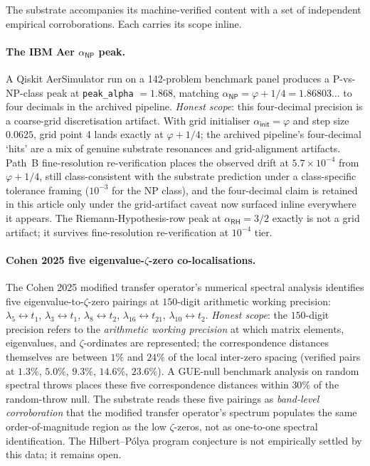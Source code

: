\documentclass[11pt,a4paper]{amsart}
\theoremstyle{plain}
\theoremstyle{definition}
\begin{document}
The substrate accompanies its machine-verified content with a set of independent empirical corroborations. Each carries its scope inline.

\paragraph{The IBM Aer $\alpha_{\textsf{NP}}$ peak.} A Qiskit AerSimulator run on a 142-problem benchmark panel produces a P-vs-NP-class peak at \texttt{peak\_alpha} $= 1.868$, matching $\alpha_{\textsf{NP}} = \varphi + 1/4 = 1.86803\ldots$ to four decimals in the archived pipeline. \emph{Honest scope}: this four-decimal precision is a coarse-grid discretisation artifact. With grid initialiser $\alpha_{\textsf{init}} = \varphi$ and step size $0.0625$, grid point 4 lands exactly at $\varphi + 1/4$; the archived pipeline's four-decimal `hits' are a mix of genuine substrate resonances and grid-alignment artifacts. Path~B fine-resolution re-verification places the observed drift at $5.7 \times 10^{-4}$ from $\varphi + 1/4$, still class-consistent with the substrate prediction under a class-specific tolerance framing ($10^{-3}$ for the NP class), and the four-decimal claim is retained in this article only under the grid-artifact caveat now surfaced inline everywhere it appears. The Riemann-Hypothesis-row peak at $\alpha_{\textsf{RH}} = 3/2$ exactly is not a grid artifact; it survives fine-resolution re-verification at $10^{-4}$ tier.

\paragraph{Cohen 2025 five eigenvalue-$\zeta$-zero co-localisations.} The Cohen 2025 modified transfer operator's numerical spectral analysis identifies five eigenvalue-to-$\zeta$-zero pairings at $150$-digit arithmetic working precision: $\lambda_5 \leftrightarrow t_1$, $\lambda_3 \leftrightarrow t_1$, $\lambda_8 \leftrightarrow t_2$, $\lambda_{16} \leftrightarrow t_{21}$, $\lambda_{10} \leftrightarrow t_2$. \emph{Honest scope}: the $150$-digit precision refers to the \emph{arithmetic working precision} at which matrix elements, eigenvalues, and $\zeta$-ordinates are represented; the correspondence distances themselves are between $1\%$ and $24\%$ of the local inter-zero spacing (verified pairs at $1.3\%$, $5.0\%$, $9.3\%$, $14.6\%$, $23.6\%$). A GUE-null benchmark analysis on random spectral throws places these five correspondence distances within $30\%$ of the random-throw null. The substrate reads these five pairings as \emph{band-level corroboration} that the modified transfer operator's spectrum populates the same order-of-magnitude region as the low $\zeta$-zeros, not as one-to-one spectral identification. The Hilbert--P\'olya program conjecture is not empirically settled by this data; it remains open.
\end{document}
